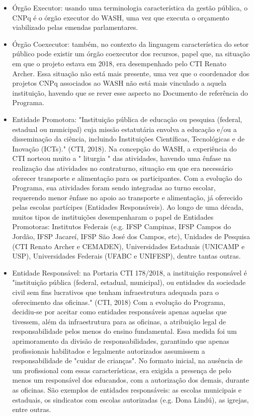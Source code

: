 \begin{itemize}
\item Órgão Executor: usando uma terminologia característica da gestão pública, o CNPq é o órgão executor do WASH, uma vez que executa o orçamento viabilizado pelas emendas parlamentares.
\item Órgão Coexecutor: também, no contexto da linguagem característica do setor público pode existir um órgão coexecutor dos recursos, papel que, na situação em que o projeto estava em 2018, era desempenhado pelo CTI Renato Archer. Essa situação não está mais presente, uma vez que o coordenador dos projetos CNPq associados ao WASH não está mais vinculado a aquela instituição, havendo que se rever esse aspecto no Documento de referência do Programa.
\item Entidade Promotora: "Instituição pública de educação ou pesquisa (federal, estadual ou municipal) cuja missão estatutária envolva a educação e/ou a disseminação da ciência, incluindo Instituições Científicas, Tecnológicas e de Inovação (ICTs)." (CTI, 2018). Na concepção do WASH, a experiência do CTI norteou muito a " liturgia " das atividades, havendo uma ênfase na realização das atividades no contraturno, situação em que era necessário oferecer transporte e alimentação para os participantes. Com a evolução do Programa, sua atividades foram sendo integradas ao turno escolar, requerendo menor ênfase no apoio ao transporte e alimentação, já oferecido pelas escolas partícipes (Entidades Responsáveis). Ao longo de uma década, muitos tipos de instituições desempenharam o papel de Entidades Promotoras: Institutos Federais (e.g. IFSP Campinas, IFSP Campos do Jordão, IFSP Jacareí, IFSP São José dos Campos, etc), Unidades de Pesquisa (CTI Renato Archer e CEMADEN), Universidades Estaduais (UNICAMP e USP), Universidades Federais (UFABC e UNIFESP), dentre tantas outras.
\item Entidade Responsável: na Portaria CTI 178/2018, a instituição responsável é "instituição pública (federal, estadual, municipal), ou entidades da sociedade civil sem fins lucrativos que tenham infraestrutura adequada para o oferecimento das oficinas."  (CTI, 2018)  Com a evolução do Programa, decidiu-se por aceitar como entidades responsáveis apenas aquelas que tivessem, além da infraestrutura para as oficinas, a atribuição legal de responsabilidade pelos menos do ensino fundamental. Essa medida foi um aprimoramento da divisão de responsabilidades, garantindo que apenas profissionais habilitados e legalmente autorizados assumissem a responsabilidade de "cuidar de crianças". No formato inicial, na ausência de um profissional com essas características, era exigida a presença de pelo menos um responsável dos educandos, com a autorização dos demais, durante as oficinas. São exemplos de entidades responsáveis: as escolas municipais e estaduais, os sindicatos com escolas autorizadas (e.g. Dona Lindú), as igrejas, entre outras.
\end{itemize}

